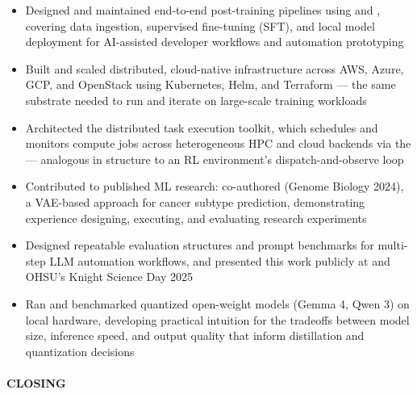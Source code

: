 \begin{itemize}

\item Designed and maintained end-to-end post-training pipelines using  and , covering data ingestion, supervised fine-tuning (SFT), and local model deployment for AI-assisted developer workflows and automation prototyping

\item Built and scaled distributed, cloud-native infrastructure across AWS, Azure, GCP, and OpenStack using Kubernetes, Helm, and Terraform --- the same substrate needed to run and iterate on large-scale training workloads

\item Architected the  distributed task execution toolkit, which schedules and monitors compute jobs across heterogeneous HPC and cloud backends via the  --- analogous in structure to an RL environment's dispatch-and-observe loop

\item Contributed to published ML research: co-authored  (Genome Biology 2024), a VAE-based approach for cancer subtype prediction, demonstrating experience designing, executing, and evaluating research experiments

\item Designed repeatable evaluation structures and prompt benchmarks for multi-step LLM automation workflows, and presented this work publicly at  and OHSU's Knight Science Day 2025

\item Ran and benchmarked quantized open-weight models (Gemma 4, Qwen 3) on local hardware, developing practical intuition for the tradeoffs between model size, inference speed, and output quality that inform distillation and quantization decisions

\end{itemize}

\paragraph{CLOSING}\

